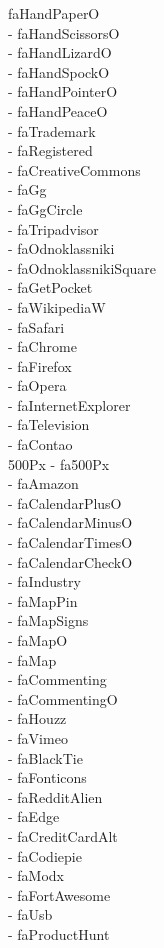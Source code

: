\documentclass[%
               doublesided,
               paper=a4,
               fontsize=10pt
              ]{my-resume}
\begin{document}
faHandPaperO\\ \faHandScissorsO - faHandScissorsO\\ \faHandLizardO - faHandLizardO\\ \faHandSpockO - faHandSpockO\\ \faHandPointerO - faHandPointerO\\ \faHandPeaceO - faHandPeaceO\\ \faTrademark - faTrademark\\ \faRegistered - faRegistered\\ \faCreativeCommons - faCreativeCommons\\ \faGg - faGg\\ \faGgCircle - faGgCircle\\ \faTripadvisor - faTripadvisor\\ \faOdnoklassniki - faOdnoklassniki\\ \faOdnoklassnikiSquare - faOdnoklassnikiSquare\\ \faGetPocket - faGetPocket\\ \faWikipediaW - faWikipediaW\\ \faSafari - faSafari\\ \faChrome - faChrome\\ \faFirefox - faFirefox\\ \faOpera - faOpera\\ \faInternetExplorer - faInternetExplorer\\ \faTelevision - faTelevision\\ \faContao - faContao\\ \fa500Px - fa500Px\\ \faAmazon - faAmazon\\ \faCalendarPlusO - faCalendarPlusO\\ \faCalendarMinusO - faCalendarMinusO\\ \faCalendarTimesO - faCalendarTimesO\\ \faCalendarCheckO - faCalendarCheckO\\ \faIndustry - faIndustry\\ \faMapPin - faMapPin\\ \faMapSigns - faMapSigns\\ \faMapO - faMapO\\ \faMap - faMap\\ \faCommenting - faCommenting\\ \faCommentingO - faCommentingO\\ \faHouzz - faHouzz\\ \faVimeo - faVimeo\\ \faBlackTie - faBlackTie\\ \faFonticons - faFonticons\\ \faRedditAlien - faRedditAlien\\ \faEdge - faEdge\\ \faCreditCardAlt - faCreditCardAlt\\ \faCodiepie - faCodiepie\\ \faModx - faModx\\ \faFortAwesome - faFortAwesome\\ \faUsb - faUsb\\ \faProductHunt - faProductHunt\\ \faMixcloud 
\end{document}
